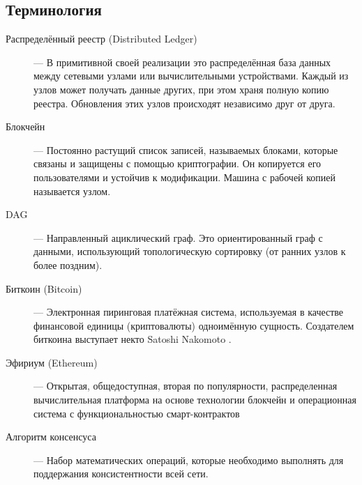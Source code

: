 \subsection{Терминология}
\begin{description}
    \item[Распределённый реестр (Distributed Ledger)] ---
        В примитивной своей реализации это распределённая база данных между
        сетевыми узлами или вычислительными устройствами.
        Каждый из узлов может получать данные других, при этом храня полную
        копию реестра. Обновления этих узлов происходят независимо друг от
        друга.

    \item[Блокчейн] ---
        Постоянно растущий список записей, называемых блоками, которые связаны
        и защищены с помощью криптографии. Он копируется его пользователями и
        устойчив к модификации. Машина с рабочей копией называется узлом.

    \item[DAG] ---
        Направленный ациклический граф. Это ориентированный граф с данными,
        использующий топологическую сортировку (от ранних узлов к более поздним).

    \item[Биткоин (Bitcoin)] ---
        Электронная пиринговая платёжная система, используемая в качестве
        финансовой единицы (криптовалюты) одноимённую сущность. Создателем
        биткоина выступает некто Satoshi Nakomoto \cite{Nakamoto2008}.

    \item[Эфириум (Ethereum)] ---
        Открытая, общедоступная, вторая по популярности, распределенная
        вычислительная платформа на основе технологии блокчейн и операционная
        система с функциональностью смарт-контрактов
        \cite{VitalikButerin2015}

    \item[Алгоритм консенсуса] ---
        Набор математических операций, которые необходимо выполнять для
        поддержания консистентности всей сети.
\end{description}

